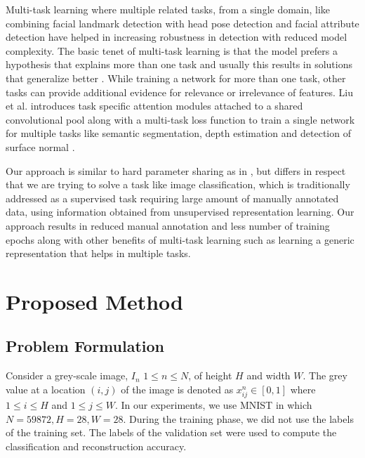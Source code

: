 \documentclass{uai2021} %
\begin{document}
Multi-task learning where multiple related tasks, from a single domain, like combining facial landmark detection with head pose detection and facial attribute detection \cite{zhang2014facial} have helped in increasing robustness in detection with reduced model complexity.
The basic tenet of multi-task learning is that the model prefers a hypothesis that explains more than one task and usually this results in solutions that generalize better \cite{ruder2017overview}.
While training a network for more than one task, other tasks can provide additional evidence for relevance or irrelevance of features.
Liu et al. introduces task specific attention modules attached to a shared convolutional pool  along with a multi-task loss function to train a single network for multiple tasks like semantic segmentation, depth estimation and detection of surface normal \cite{liu2019end}.

Our approach is similar to hard parameter sharing as in \cite{zhang2014facial} \cite{dai2016instance}, but differs in respect that we are trying to solve a task like image classification, which is traditionally addressed as a supervised task requiring large amount of manually annotated data, using information obtained from  unsupervised representation learning.
Our approach results in reduced manual annotation and less number of training epochs along with other benefits of multi-task learning such as learning a generic representation that helps in multiple tasks.


\section{Proposed Method} \label{proposed_method}

\subsection{Problem Formulation} \label{problem_formulation}
Consider a grey-scale image, $I_n$  $1\leq n \leq N$,  of height  $H$ and width $W$. The grey value at a location $(i, j)$ of the image is denoted  as $x_{ij}^{n} \in [0,1]$  where $1 \leq i \leq H$  and  $1\leq j \leq W$.
In our experiments, we use MNIST in which $N= 59872, H=28,  W= 28$. During the training phase, we did not use the labels of the training set.
The labels of the validation set were used to compute the classification and reconstruction accuracy.
\end{document}
